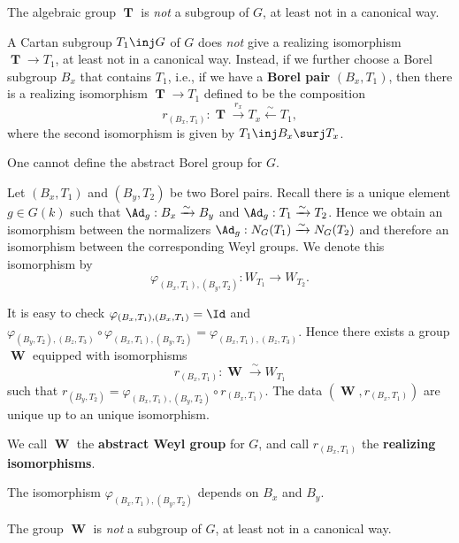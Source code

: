 	\begin{warn}
		The algebraic group $\mbfT$ is \emph{not} a subgroup of $G$, at least not in a canonical way.
	\end{warn}

	\begin{rem}
		A Cartan subgroup $T_1\inj G$ of $G$ does \emph{not} give a realizing isomorphism $\mbfT \to T_1$, at least not in a canonical way. Instead, if we further choose a Borel subgroup $B_x$ that contains $T_1$, i.e., if we have a \textbf{Borel pair} $(B_x,T_1)$, then there is a realizing isomorphism $\mbfT \to T_1$ defined to be the composition
		\[
			r_{(B_x,T_1)}:\mbfT \xrightarrow{r_x} T_x \xleftarrow{\sim} T_1,
		\]
		where the second isomorphism is given by $T_1 \inj B_x \surj T_x$.
	\end{rem}

	\begin{warn}
		One cannot define the abstract Borel group for $G$.
	\end{warn}

	\begin{constr}
		Let $(B_x,T_1)$ and $(B_y,T_2)$ be two Borel pairs. Recall there is a unique element $g\in G(k)$ such that $\Ad_g: B_x\xrightarrow{\sim} B_y$ and $\Ad_g: T_1 \xrightarrow{\sim} T_2$. Hence we obtain an isomorphism between the normalizers $\Ad_g: N_G(T_1) \xrightarrow{\sim} N_G(T_2)$ and therefore an isomorphism between the corresponding Weyl groups. We denote this isomorphism by
		\[
			\varphi_{(B_x,T_1),(B_y,T_2)}: W_{T_1} \to W_{T_2}.
		\]

		It is easy to check $\varphi_{(B_x,T_1),(B_x,T_1)}=\Id$ and $ \varphi_{(B_y,T_2),(B_z,T_3)}\circ \varphi_{(B_x,T_1),(B_y,T_2)} = \varphi_{(B_x,T_1),(B_z,T_3)} $. Hence there exists a group $\mbfW$ equipped with isomorphisms
		\[
			r_{(B_x,T_1)}: \mbfW \xrightarrow{\sim} W_{T_1}
		\]
		such that $r_{(B_y,T_2)} = \varphi_{(B_x,T_1),(B_y,T_2)}\circ r_{(B_x,T_1)}$. The data $(\mbfW, r_{(B_x,T_1)})$ are unique up to an unique isomorphism.

		We call $\mbfW$ the \textbf{abstract Weyl group} for $G$, and call $r_{(B_x,T_1)}$ the \textbf{realizing isomorphisms}.

	\end{constr}

	\begin{warn}
		The isomorphism $\varphi_{(B_x,T_1),(B_y,T_2)}$ depends on $B_x$ and $B_y$.
	\end{warn}

	\begin{warn}
		The group $\mbfW$ is \emph{not} a subgroup of $G$, at least not in a canonical way.
	\end{warn}

